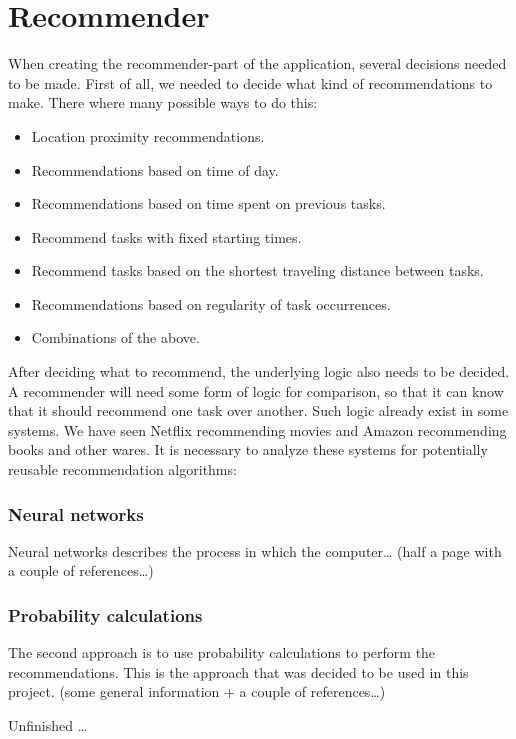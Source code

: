 \section{Recommender}
\label{sec:recommender}

When creating the recommender-part of the application, several decisions needed to be made. First of all, we needed to decide what kind of recommendations to make. There where many possible ways to do this:
\begin{itemize}
	\item Location proximity recommendations.
  \item Recommendations based on time of day.
  \item Recommendations based on time spent on previous tasks.
  \item Recommend tasks with fixed starting times.
  \item Recommend tasks based on the shortest traveling distance between tasks.
  \item Recommendations based on regularity of task occurrences.
  \item Combinations of the above.
\end{itemize}

After deciding what to recommend, the underlying logic also needs to be decided. A recommender will need some form of logic for comparison, so that it can know that it should recommend one task over another. Such logic already exist in some systems. We have seen Netflix\cite{netflix} recommending movies and Amazon\cite{amazon} recommending books and other wares. It is necessary to analyze these systems for potentially reusable recommendation algorithms:

\subsubsection{Neural networks}
Neural networks describes the process in which the computer\ldots
(half a page with a couple of references\ldots)

\subsubsection{Probability calculations}
The second approach is to use probability calculations to perform the recommendations. This is the approach that was decided to be used in this project. (some general information + a couple of references\ldots)

Unfinished \ldots

